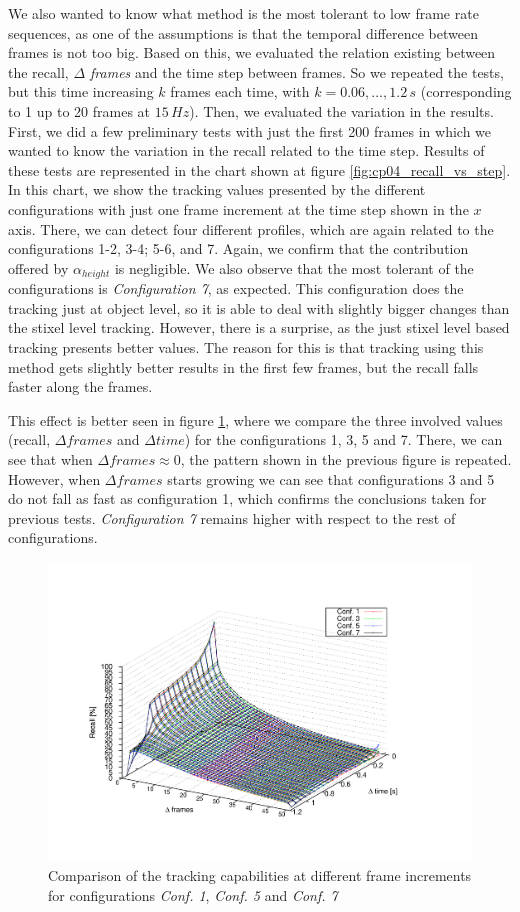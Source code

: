 We also wanted to know what method is the most tolerant to low frame rate sequences, as one of the assumptions is that the temporal difference between frames is not too big. Based on this, we evaluated the relation existing between the recall, \emph{$\Delta$ frames} and the time step between frames. So we repeated the tests, but this time increasing $k$ frames each time, with $k=0.06,\dots,1.2\,s$ (corresponding to 1 up to 20 frames at $15\,Hz$). Then, we evaluated the variation in the results. First, we did a few preliminary tests with just the first 200 frames in which we wanted to know the variation in the recall related to the time step. Results of these tests are represented in the chart shown at figure \ref{fig:cp04_recall_vs_step}. In this chart, we show the tracking values presented by the different configurations with just one frame increment at the time step shown in the $x$ axis. There, we can detect four different profiles, which are again related to the configurations 1-2, 3-4; 5-6, and 7. Again, we confirm that the contribution offered by $\alpha_{height}$ is negligible. We also observe that the most tolerant of the configurations is \emph{Configuration 7}, as expected. This configuration does the tracking just at object level, so it is able to deal with slightly bigger changes than the stixel level tracking. However, there is a surprise, as the just stixel level based tracking presents better values. The reason for this is that tracking using this method gets slightly better results in the first few frames, but the recall falls faster along the frames.

This effect is better seen in figure \ref{fig:cp04_recall_vs_delta_frames_vs_step}, where we compare the three involved values (recall, $\Delta frames$ and $\Delta time$) for the configurations 1, 3, 5 and 7. There, we can see that when $\Delta frames \approx 0$, the pattern shown in the previous figure is repeated. However, when $\Delta frames$ starts growing we can see that configurations 3 and 5 do not fall as fast as configuration 1, which confirms the conclusions taken for previous tests. \emph{Configuration 7} remains higher with respect to the rest of configurations.

\begin{figure}[t]
\centering
\includegraphics[width=\textwidth,height=0.5\textwidth,trim=80 90 140 90,clip]{recall_vs_delta_frames_vs_step_28b_1_16b}
\caption{Comparison of the tracking capabilities at different frame increments for configurations \emph{Conf. 1}, \emph{Conf. 5} and \emph{Conf. 7}}\label{fig:cp04_recall_vs_delta_frames_vs_step}
\end{figure}


